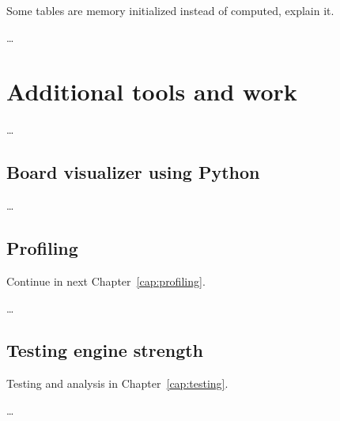 Some tables are memory initialized instead of computed, explain it.

\ldots

\section{Additional tools and work}

\ldots

\subsection{Board visualizer using Python}

\ldots

\subsection{Profiling}

Continue in next Chapter~\ref{cap:profiling}.

\ldots

\subsection{Testing engine strength}

Testing and analysis in Chapter~\ref{cap:testing}.

\ldots